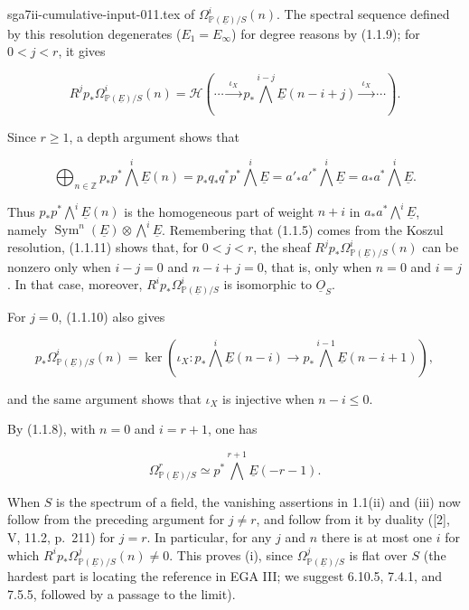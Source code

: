 \begin{filecontents*}{sga7ii-cumulative-input-011.tex}
of $\Omega^i_{\mathbb P(\underline E)/S}(n)$.  The spectral sequence
defined by this resolution degenerates ($E_1=E_\infty$) for degree reasons
by (1.1.9); for $0<j<r$, it gives

\begin{equation}\tag{1.1.11}
R^jp_*\Omega^i_{\mathbb P(\underline E)/S}(n)
=\mathcal H\left(\cdots\xrightarrow{\ \iota_X\ }
p_*\bigwedge^{i-j}\underline E(n-i+j)
\xrightarrow{\ \iota_X\ }\cdots\right).
\end{equation}

Since $r\geq1$, a depth argument shows that

\begin{equation}\tag{1.1.12}
\bigoplus_{n\in\mathbb Z}p_*p^*\bigwedge^i\underline E(n)
=p_*q_*q^*p^*\bigwedge^i\underline E
={a'}_*{a'}^*\bigwedge^i\underline E
=a_*a^*\bigwedge^i\underline E.
\end{equation}


Thus $p_*p^*\bigwedge^i\underline E(n)$ is the homogeneous part of weight
$n+i$ in $a_*a^*\bigwedge^i\underline E$, namely
$\operatorname{Sym}^n(\underline E)\otimes\bigwedge^i\underline E$.
Remembering that (1.1.5) comes from the Koszul resolution, (1.1.11) shows
that, for $0<j<r$, the sheaf
$R^jp_*\Omega^i_{\mathbb P(\underline E)/S}(n)$ can be nonzero only when
$i-j=0$ and $n-i+j=0$, that is, only when $n=0$ and $i=j$.  In that case,
moreover, $R^ip_*\Omega^i_{\mathbb P(\underline E)/S}$ is isomorphic to
$\underline O_S$.

For $j=0$, (1.1.10) also gives

\begin{equation}\tag{1.1.13}
p_*\Omega^i_{\mathbb P(\underline E)/S}(n)
=\ker\!\left(\iota_X:
p_*\bigwedge^i\underline E(n-i)\longrightarrow
p_*\bigwedge^{i-1}\underline E(n-i+1)\right),
\end{equation}

and the same argument shows that $\iota_X$ is injective when $n-i\leq0$.

By (1.1.8), with $n=0$ and $i=r+1$, one has

\begin{equation*}
\Omega^r_{\mathbb P(\underline E)/S}\simeq
p^*\bigwedge^{r+1}\underline E(-r-1).
\end{equation*}

When $S$ is the spectrum of a field, the vanishing assertions in 1.1(ii)
and (iii) now follow from the preceding argument for $j\ne r$, and follow
from it by duality ([2], V, 11.2, p.~211) for $j=r$.  In particular, for
any $j$ and $n$ there is at most one $i$ for which
$R^ip_*\Omega^j_{\mathbb P(\underline E)/S}(n)\ne0$.  This proves (i),
since $\Omega^j_{\mathbb P(\underline E)/S}$ is flat over $S$ (the hardest
part is locating the reference in EGA III; we suggest 6.10.5, 7.4.1, and
7.5.5, followed by a passage to the limit).


\end{filecontents*}

